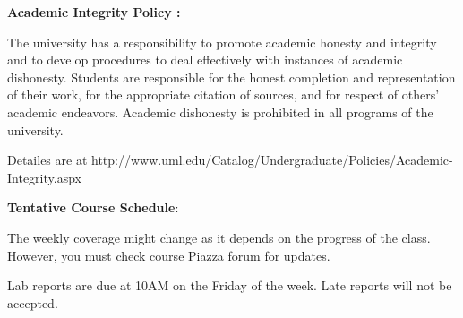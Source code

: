 \documentclass[11pt]{article}
\begin{document}
\textbf {\large Academic Integrity Policy :} 

The university has a responsibility to promote academic honesty and integrity and to develop procedures to deal effectively with instances of academic dishonesty. Students are responsible for the honest completion and representation of their work, for the appropriate citation of sources, and for respect of others’ academic endeavors. Academic dishonesty is prohibited in all programs of the university.

Detailes are at http://www.uml.edu/Catalog/Undergraduate/Policies/Academic-Integrity.aspx


\newpage

\textbf {\large Tentative Course Schedule}:

The weekly coverage might change as it depends on the progress of the class.  However, you must check course Piazza forum for updates.

Lab reports are due at 10AM on the Friday of the week. Late reports will not be accepted.
\end{document}
